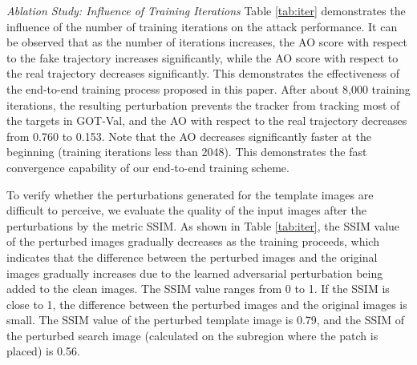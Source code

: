 \documentclass[journal]{IEEEtran}
\begin{document}

\textit{Ablation Study: Influence of Training Iterations} Table \ref{tab:iter} demonstrates the influence of the number of training iterations on the attack performance. It can be observed that as the number of iterations increases, the AO score with respect to the fake trajectory increases significantly, while the AO score with respect to the real trajectory decreases significantly. This demonstrates the effectiveness of the end-to-end training process proposed in this paper. After about 8,000 training iterations, the resulting perturbation prevents the tracker from tracking most of the targets in GOT-Val, and the AO with respect to the real trajectory decreases from 0.760 to 0.153. Note that the AO decreases significantly faster at the beginning (training iterations less than 2048). This demonstrates the fast convergence capability of our end-to-end training scheme.

To verify whether the perturbations generated for the template images are difficult to perceive, we evaluate the quality of the input images after the perturbations by the metric SSIM. As shown in Table \ref{tab:iter}, the SSIM value of the perturbed images gradually decreases as the training proceeds, which indicates that the difference between the perturbed images and the original images gradually increases due to the learned adversarial perturbation being added to the clean images. The SSIM value ranges from 0 to 1. If the SSIM is close to 1, the difference between the perturbed images and the original images is small. The SSIM value of the perturbed template image is 0.79, and the SSIM of the perturbed search image (calculated on the subregion where the patch is placed) is 0.56. 
\end{document}
